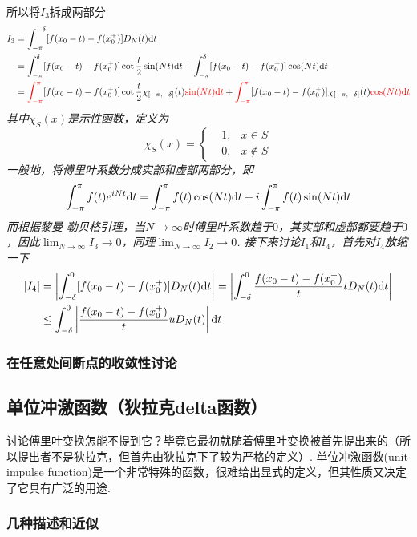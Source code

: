 \documentclass[UTF8]{ctexart}
\newcommand{\trm}[1]{{\rm #1}}
\begin{document}
所以将\(I_3\)拆成两部分
\begin{align*}
    I_3 &= \int_{-\pi}^{-\delta}[f(x_0-t)-f(x_0^+)]D_N(t)\trm{d}t \\
    &= \int_{-\pi}^{\delta}[f(x_0-t)-f(x_0^+)]\cot\frac{t}{2}\sin(Nt)\trm{d}t + \int_{-\pi}^{\delta}[f(x_0-t)-f(x_0^+)]\cos(Nt)\trm{d}t \\
    &= {\color{red}\int_{-\pi}^{\pi}}[f(x_0-t)-f(x_0^+)]\cot\frac{t}{2}\chi_{[-\pi,-\delta]}(t){\color{red}\sin(Nt)\trm{d}t} + {\color{red} \int_{-\pi}^{\pi}}[f(x_0-t)-f(x_0^+)]\chi_{[-\pi,-\delta]}(t){\color{red}\cos(Nt)\trm{d}t}
\end{align*}
\textit{其中\(\chi_S(x)\)是示性函数，定义为}
\[\chi_S(x) = \left\{\begin{aligned} & 1, & x \in S \\ & 0, &x \not\in S \end{aligned}\right.\]
\textit{
    一般地，将傅里叶系数分成实部和虚部两部分，即
    \[\int_{-\pi}^{\pi}f(t)e^{iNt}\trm{d}t = \int_{-\pi}^{\pi}f(t)\cos(Nt)\trm{d}t + i\int_{-\pi}^{\pi}f(t)\sin(Nt)\trm{d}t\]
    而根据黎曼-勒贝格引理，当\(N\to\infty\)时傅里叶系数趋于\(0\)，其实部和虚部都要趋于\(0\)，因此\(\displaystyle{\lim_{N\to\infty}I_3 \to 0}\)，同理\(\displaystyle{\lim_{N\to\infty}I_2 \to 0}\).
    接下来讨论\(I_1\)和\(I_4\)，首先对\(I_4\)放缩一下
}
\begin{align*}
    |I_4| &= \left|\int_{-\delta}^{0}[f(x_0-t)-f(x_0^+)]D_N(t)\trm{d}t\right| = \left|\int_{-\delta}^{0}\frac{f(x_0-t)-f(x_0^+)}{t}tD_N(t)\trm{d}t\right| \\
        &\leq \int_{-\delta}^{0}\left|\frac{f(x_0-t)-f(x_0^+)}{t}uD_N(t)\right|\trm{d}t
\end{align*}

\subsubsection{在任意处间断点的收敛性讨论}

\subsection{单位冲激函数（狄拉克delta函数）}

讨论傅里叶变换怎能不提到它？毕竟它最初就随着傅里叶变换被首先提出来的（所以提出者不是狄拉克，但首先由狄拉克下了较为严格的定义）. \uline{单位冲激函数}(unit impulse function)是一个非常特殊的函数，很难给出显式的定义，但其性质又决定了它具有广泛的用途.

\subsubsection{几种描述和近似}
\end{document}
